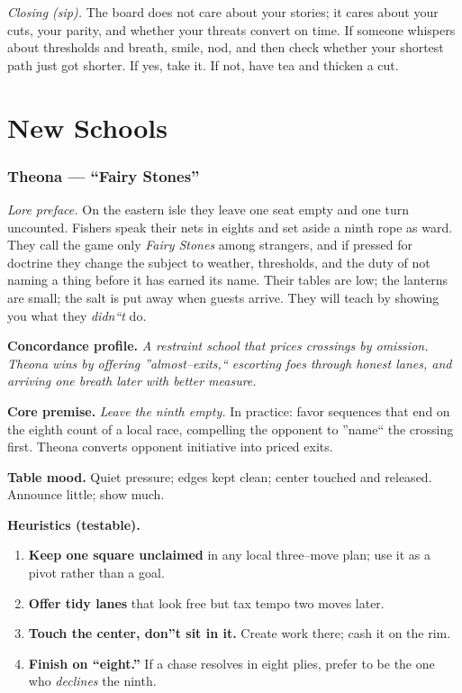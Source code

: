 \documentclass[11pt]{article}
\numberwithin{equation}{section} %
\theoremstyle{plain} %
\theoremstyle{definition} %
\theoremstyle{remark} %
\begin{document}
\medskip
\noindent\textit{Closing (sip).} The board does not care about your stories; it cares about your cuts, your parity, and whether your threats convert on time. If someone whispers about thresholds and breath, smile, nod, and then check whether your shortest path just got shorter. If yes, take it. If not, have tea and thicken a cut.

\clearpage
\section{New Schools}
\label{app:schools}

\subsubsection{Theona --- ``Fairy Stones''}
\label{school:theona}
{}

\noindent\textit{Lore preface.} On the eastern isle they leave one seat empty and one turn uncounted. Fishers speak their nets in eights and set aside a ninth rope as ward. They call the game only \emph{Fairy Stones} among strangers, and if pressed for doctrine they change the subject to weather, thresholds, and the duty of not naming a thing before it has earned its name. Their tables are low; the lanterns are small; the salt is put away when guests arrive. They will teach by showing you what they \emph{didn``t} do.

\medskip
\noindent\textbf{Concordance profile.} \emph{A restraint school that prices crossings by omission. Theona wins by offering ''almost--exits,`` escorting foes through honest lanes, and arriving one breath later with better measure.}

\medskip
\noindent\textbf{Core premise.} \textit{Leave the ninth empty.} In practice: favor sequences that end on the eighth count of a local race, compelling the opponent to ''name`` the crossing first. Theona converts opponent initiative into priced exits.

\medskip
\noindent\textbf{Table mood.} Quiet pressure; edges kept clean; center touched and released. Announce little; show much.

\medskip
\noindent\textbf{Heuristics (testable).}
\begin{enumerate}\setlength\itemsep{0.25em}
  \item \textbf{Keep one square unclaimed} in any local three--move plan; use it as a pivot rather than a goal.
  \item \textbf{Offer tidy lanes} that look free but tax tempo two moves later.
  \item \textbf{Touch the center, don''t sit in it.} Create work there; cash it on the rim.
  \item \textbf{Finish on ``eight.''} If a chase resolves in eight plies, prefer to be the one who \emph{declines} the ninth.
\end{enumerate}
\end{document}
